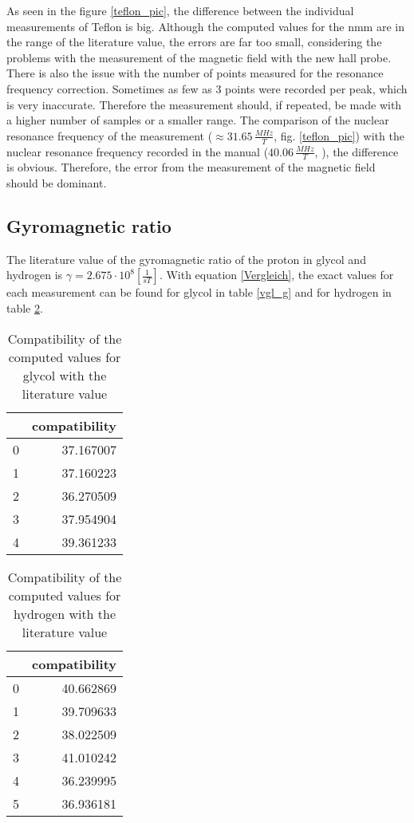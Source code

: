 As seen in the figure \ref{teflon_pic}, the difference between the individual measurements of Teflon is big. Although the computed values for the nmm are in the range of the literature value, the errors are far too small, considering the problems with the measurement of the magnetic field with the new hall probe. There is also the issue with the number of points measured for the resonance frequency correction. Sometimes as few as 3 points were recorded per peak, which is very inaccurate. Therefore the measurement should, if repeated, be made with a higher number of samples or a smaller range. The comparison of the nuclear resonance frequency of the measurement ($\approx 31.65\,\frac{MHz}{T}$, fig. \ref{teflon_pic}) with the nuclear resonance frequency recorded in the manual ($40.06\,\frac{MHz}{T}$, \cite{anleitung}), the difference is obvious. Therefore, the error from the measurement of the magnetic field should be dominant.

\FloatBarrier
\subsection{Gyromagnetic ratio}
The literature value of the gyromagnetic ratio of the proton in glycol and hydrogen is $\gamma =  2.675\cdot 10^8 \left[\frac{1}{s T}\right]$. With equation \ref{Vergleich}, the exact values for each measurement can be found for glycol in table \ref{vgl_g} and for hydrogen in table \ref{vlg_h}.

\begin{table}
	\caption{Compatibility of the computed values for glycol with the literature value}
	\label{vlg_g}
	\centering

\begin{tabular}{lr}
	\toprule
	{} &  compatibility \\
	\midrule
	0 &      37.167007 \\
	1 &      37.160223 \\
	2 &      36.270509 \\
	3 &      37.954904 \\
	4 &      39.361233 \\
	\bottomrule
\end{tabular}
\end{table}

\begin{table}
	
	\caption{Compatibility of the computed values for hydrogen with the literature value}
	\label{vlg_h}
	\centering
	\begin{tabular}{lr}
	\toprule
	{} &  compatibility \\
	\midrule
	0 &      40.662869 \\
	1 &      39.709633 \\
	2 &      38.022509 \\
	3 &      41.010242 \\
	4 &      36.239995 \\
	5 &      36.936181 \\
	\bottomrule
\end{tabular}


\end{table}

